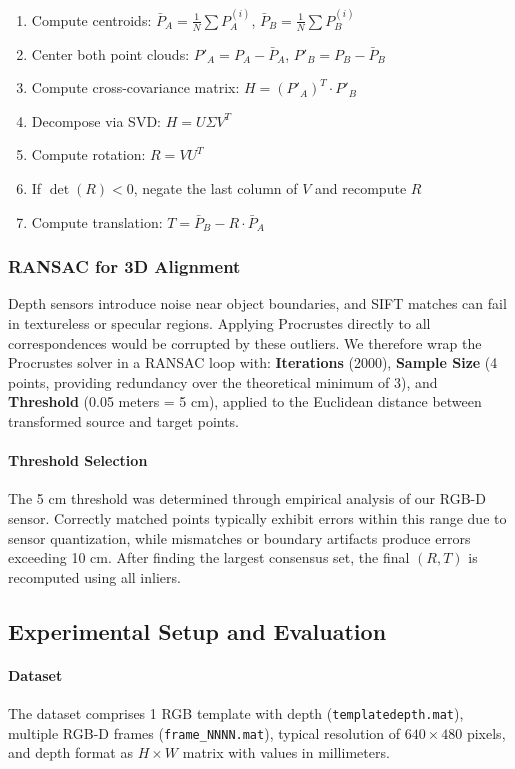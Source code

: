 \documentclass[10pt,twocolumn]{extarticle}
\begin{document}
\begin{enumerate}
    \item Compute centroids: $\bar{P}_A = \frac{1}{N}\sum P_A^{(i)}$, $\bar{P}_B = \frac{1}{N}\sum P_B^{(i)}$
    \item Center both point clouds: $P'_A = P_A - \bar{P}_A$, $P'_B = P_B - \bar{P}_B$
    \item Compute cross-covariance matrix: $H = (P'_A)^T \cdot P'_B$
    \item Decompose via SVD: $H = U \Sigma V^T$
    \item Compute rotation: $R = V U^T$
    \item If $\det(R) < 0$, negate the last column of $V$ and recompute $R$~\cite{umeyama1991}
    \item Compute translation: $T = \bar{P}_B - R \cdot \bar{P}_A$
\end{enumerate}

\subsubsection{RANSAC for 3D Alignment}
Depth sensors introduce noise near object boundaries, and SIFT matches can fail in textureless or specular regions. Applying Procrustes directly to all correspondences would be corrupted by these outliers. We therefore wrap the Procrustes solver in a RANSAC loop with: \textbf{Iterations} (2000), \textbf{Sample Size} (4 points, providing redundancy over the theoretical minimum of 3), and \textbf{Threshold} (0.05 meters = 5 cm), applied to the Euclidean distance between transformed source and target points.

\paragraph{Threshold Selection} The 5 cm threshold was determined through empirical analysis of our RGB-D sensor. Correctly matched points typically exhibit errors within this range due to sensor quantization, while mismatches or boundary artifacts produce errors exceeding 10 cm. After finding the largest consensus set, the final $(R, T)$ is recomputed using all inliers.

\subsection{Experimental Setup and Evaluation}

\paragraph{Dataset}
The dataset comprises 1 RGB template with depth (\texttt{templatedepth.mat}), multiple RGB-D frames (\texttt{frame\_NNNN.mat}), typical resolution of $640\times 480$ pixels, and depth format as $H \times W$ matrix with values in millimeters.
\end{document}
